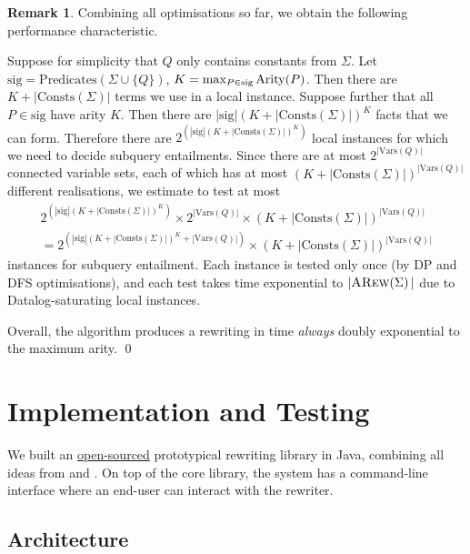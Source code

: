 \documentclass[12pt]{report}
\theoremstyle{plain}
\theoremstyle{definition}
\newtheorem{remark}[theorem]{Remark}
\def\Vars{{\mathrm{Vars}}}
\def\Consts{{\mathrm{Consts}}}
\def\Predicates{{\mathrm{Predicates}}}
\newcommand{\Arity}[1]{\ensuremath{\normalfont{\operatorname{Arity}}\!\left( #1 \right)}}
\newcommand{\ARew}[1]{\ensuremath{\normalfont{\textsc{ARew}}\!\left( #1 \right)}}
\begin{document}
\begin{remark}
\label{remark:rewriting-complexity}
  Combining all optimisations so far, we obtain the following performance characteristic.
  
  Suppose for simplicity that $Q$ only contains constants from $\Sigma$. Let $\mathrm{sig} = \Predicates(\Sigma \cup \{Q\})$, $K = \max_{P \in \mathrm{sig}} \Arity{P}$. Then there are $K + |\Consts(\Sigma)|$ terms we use in a local instance. Suppose further that all $P \in \mathrm{sig}$ have arity $K$. Then there are $|\mathrm{sig}| (K + |\Consts(\Sigma)|)^K$ facts that we can form. Therefore there are $2^{\left(|\mathrm{sig}| (K + |\Consts(\Sigma)|)^K\right)}$ local instances for which we need to decide subquery entailments. Since there are at most $2^{|\Vars(Q)|}$ connected variable sets, each of which has at most $(K + |\Consts(\Sigma)|)^{|\Vars(Q)|}$ different realisations, we estimate to test at most \begin{multline}
  \label{equation:subquery-entailment-instances-number-estimation}
    2^{\left(|\mathrm{sig}| (K + |\Consts(\Sigma)|)^K\right)} \times 2^{|\Vars(Q)|} \times (K + |\Consts(\Sigma)|)^{|\Vars(Q)|} \\
    = 2^{\left(|\mathrm{sig}| (K + |\Consts(\Sigma)|)^K + |\Vars(Q)|\right)} \times (K + |\Consts(\Sigma)|)^{|\Vars(Q)|}
  \end{multline}
  instances for subquery entailment. Each instance is tested only once (by DP and DFS optimisations), and each test takes time exponential to $|\ARew{\Sigma}|$ due to Datalog-saturating local instances.

  Overall, the algorithm produces a rewriting in time \emph{always} doubly exponential to the maximum arity.
  \qed
\end{remark}

\newpage
\chapter{Implementation and Testing}

We built an \href{https://github.com/kory33/guarded-queries}{open-sourced} prototypical rewriting library in Java, combining all ideas from  and . On top of the core library, the system has a command-line interface where an end-user can interact with the rewriter.

\section{Architecture}
\end{document}
